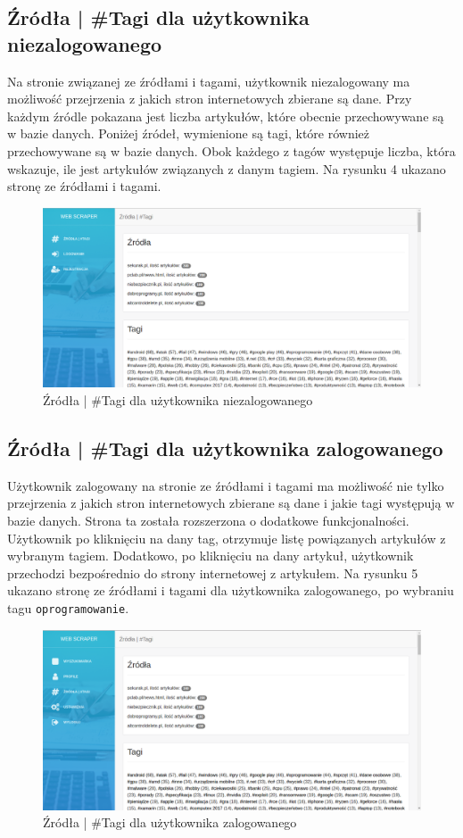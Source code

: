 \documentclass[12pt, titlepage]{article}
\begin{document}
	\newpage
	\subsection{Źródła | \#Tagi dla użytkownika niezalogowanego}
	Na stronie związanej ze źródłami i tagami, użytkownik niezalogowany ma możliwość przejrzenia z jakich stron internetowych zbierane są dane. Przy każdym źródle pokazana jest liczba artykułów, które obecnie przechowywane są w bazie danych. Poniżej źródeł, wymienione są tagi, które również przechowywane są w bazie danych. Obok każdego z tagów występuje liczba, która wskazuje, ile jest artykułów związanych z danym tagiem. Na rysunku 4 ukazano stronę ze źródłami i tagami.
	\begin{figure}[H]
		\centering
		\includegraphics[scale=0.40]{obrazki/niezalogowanyZrodla.png}
		\caption{Źródła | \#Tagi dla użytkownika niezalogowanego}
		\label{fig:db_schema}
	\end{figure}
	
	\newpage
	\subsection{Źródła | \#Tagi dla użytkownika zalogowanego}
	Użytkownik zalogowany na stronie ze źródłami i tagami ma możliwość nie tylko przejrzenia z jakich stron internetowych zbierane są dane i jakie tagi występują w bazie danych. Strona ta została rozszerzona o dodatkowe funkcjonalności. Użytkownik po kliknięciu na dany tag, otrzymuje listę powiązanych artykułów  z wybranym tagiem. Dodatkowo, po kliknięciu na dany artykuł, użytkownik przechodzi bezpośrednio do strony internetowej z artykułem. Na rysunku 5 ukazano stronę ze źródłami i tagami dla użytkownika zalogowanego, po wybraniu tagu \texttt{oprogramowanie}.
	\begin{figure}[H]
		\centering
		\includegraphics[scale=0.40]{obrazki/zalogowanyZrodla.png}
		\caption{Źródła | \#Tagi dla użytkownika zalogowanego}
		\label{fig:db_schema}
	\end{figure}
	
\end{document}
